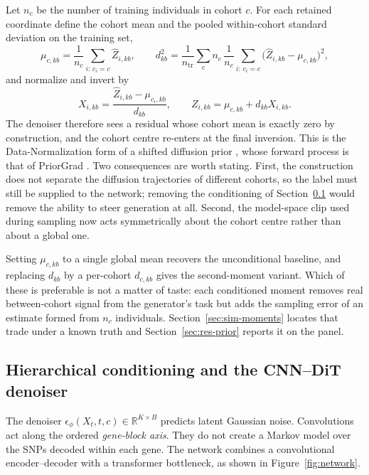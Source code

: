 \documentclass[11pt,a4paper]{article}
\newcommand{\tr}{\mathrm{tr}}
\begin{document}
Let $n_c$ be the number of training individuals in cohort $c$. For each
retained coordinate define the cohort mean and the pooled within-cohort
standard deviation on the training set,
\begin{equation}
 \mu_{c,kb}=\frac1{n_c}\sum_{i:\,c_i=c}\widehat Z_{i,kb},
 \qquad
 d_{kb}^2=\frac{1}{n_{\tr}}\sum_{c}n_c\,
   \frac1{n_c}\sum_{i:\,c_i=c}\bigl(\widehat Z_{i,kb}-\mu_{c,kb}\bigr)^2 ,
 \label{eq:moments}
\end{equation}
and normalize and invert by
\begin{equation}
 X_{i,kb}=\frac{\widehat Z_{i,kb}-\mu_{c_i,kb}}{d_{kb}},\qquad
 Z_{i,kb}=\mu_{c,kb}+d_{kb}X_{i,kb}.
 \label{eq:standard}
\end{equation}
The denoiser therefore sees a residual whose cohort mean is exactly zero by
construction, and the cohort centre re-enters at the final inversion. This is
the Data-Normalization form of a shifted diffusion prior \citep{Li2023}, whose
forward process is that of PriorGrad \citep{Lee2022}. Two consequences are
worth stating. First, the construction does not separate the diffusion
trajectories of different cohorts, so the label must still be supplied to the
network; removing the conditioning of Section~\ref{sec:network} would remove
the ability to steer generation at all. Second, the model-space clip used
during sampling now acts symmetrically about the cohort centre rather than
about a global one.

Setting $\mu_{c,kb}$ to a single global mean recovers the unconditional
baseline, and replacing $d_{kb}$ by a per-cohort $d_{c,kb}$ gives the
second-moment variant. Which of these is preferable is not a matter of taste:
each conditioned moment removes real between-cohort signal from the
generator's task but adds the sampling error of an estimate formed from $n_c$
individuals. Section~\ref{sec:sim-moments} locates that trade under a known
truth and Section~\ref{sec:res-prior} reports it on the panel.

\subsection{Hierarchical conditioning and the CNN--DiT denoiser}
\label{sec:network}

The denoiser $\epsilon_\phi(X_t,t,c)\in\mathbb R^{K\times B}$ predicts latent
Gaussian noise. Convolutions act along the ordered \emph{gene-block axis}.
They do not create a Markov model over the SNPs decoded within each gene.
The network combines a convolutional encoder--decoder with a transformer
bottleneck, as shown in Figure~\ref{fig:network}.
\end{document}
